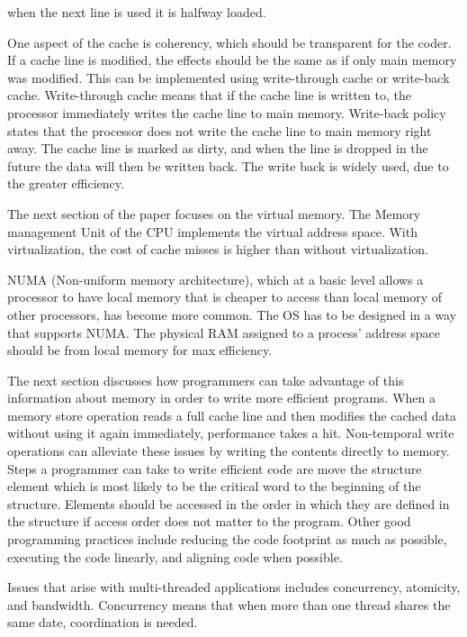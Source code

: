 \documentclass[letterpaper,12pt,titlepage]{article}
\begin{document}
when the next line is used it is halfway loaded.
\newline
\par
One aspect of the cache is coherency, which should be transparent for the coder.  If a cache line is modified, the effects should be the
same as if only main memory was modified.  This can be implemented using write-through cache or write-back cache.  Write-through cache means
that if the cache line is written to, the processor immediately writes the cache line to main memory.  Write-back policy states that
the processor does not write the cache line to main memory right away.  The cache line is marked as dirty, and when the line is dropped
in the future the data will then be written back.  The write back is widely used, due to the greater efficiency.
\newline
\par
The next section of the paper focuses on the virtual memory.  The Memory management Unit of the CPU implements the virtual address space.
With virtualization, the cost of cache misses is higher than without virtualization.
\newline
\par
NUMA (Non-uniform memory architecture), which at a basic level allows a processor to have local memory that is cheaper to access
than local memory of other processors, has become more common.  The OS has to be designed in a way that supports NUMA.  The physical RAM
assigned to a process' address space should be from local memory for max efficiency.
\newline
\par
The next section discusses how programmers can take advantage of this information about memory in order to write more efficient programs.  When a memory
store operation reads a full cache line and then modifies the cached data without using it again immediately, performance takes a hit.   
Non-temporal write operations can alleviate these issues by writing the contents directly to memory.
Steps a programmer can take to write efficient code are move the structure 
element which is most likely to be the critical word to the beginning of 
the structure.  Elements should be accessed in the order in which they are 
defined in the structure if access order does not matter to the program.
Other good programming practices include reducing the code footprint as 
much as possible, executing the code linearly, and aligning code when 
possible.
\newline
\par
Issues that arise with multi-threaded applications includes concurrency, 
atomicity, and bandwidth.  Concurrency means that when more than one thread 
shares the same date, coordination is needed.

 
\end{document}
